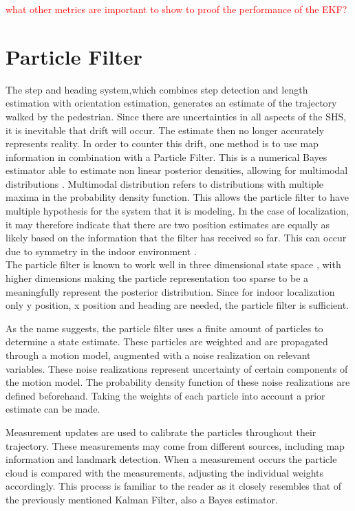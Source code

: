 \textcolor{red}{what other metrics are important to show to proof the performance of the EKF?}

\newpage
\section{Particle Filter}
\label{sec:method-pf}
The step and heading system,which combines step detection and length estimation with orientation estimation, generates an estimate of the trajectory walked by the pedestrian. Since there are uncertainties in all aspects of the SHS, it is inevitable that drift will occur. The estimate then no longer accurately represents reality. In order to counter this drift, one method is to use map information in combination with a Particle Filter. This is a numerical Bayes estimator able to estimate non linear posterior densities, allowing for multimodal distributions \cite{gustafsson2010particle,kihlberg2012map}. Multimodal distribution refers to distributions with multiple maxima in the probability density function. This allows the particle filter to have multiple hypothesis for the system that it is modeling. In the case of localization, it may therefore indicate that there are two position estimates are equally as likely based on the information that the filter has received so far. This can occur due to symmetry in the indoor environment \cite{Woodman2008}. \\
The particle filter is known to work well in three dimensional state space \cite{gustafsson2010particle}, with higher dimensions making the particle representation too sparse to be a meaningfully represent the posterior distribution. Since for indoor localization only y position, x position and heading are needed, the particle filter is sufficient.
\par
As the name suggests, the particle filter uses a finite amount of particles to determine a state estimate. These particles are weighted and are propagated through a motion model, augmented with a noise realization on relevant variables. These noise realizations represent uncertainty of certain components of the motion model. The probability density function of these noise realizations are defined beforehand. Taking the weights of each particle into account a prior estimate can be made. \par 
Measurement updates are used to calibrate the particles throughout their trajectory. These measurements may come from different sources, including map information and landmark detection. When a measurement occurs the particle cloud is compared with the measurements, adjusting the individual weights accordingly. This process is familiar to the reader as it closely resembles that of the previously mentioned Kalman Filter, also a Bayes estimator.\par

